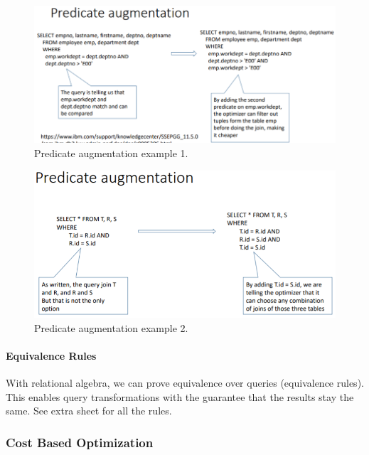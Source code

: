 \begin{figure}[h]
	\centering
	\includegraphics[scale=0.5]{images/3-aug1.PNG}
	\caption{Predicate augmentation example 1.}
	\label{fig:aug1}
\end{figure}

\begin{figure}[h]
	\centering
	\includegraphics[scale=0.5]{images/3-aug2.PNG}
	\caption{Predicate augmentation example 2.}
	\label{fig:aug2}
\end{figure}


\paragraph{Equivalence Rules}
With relational algebra, we can prove equivalence over queries (equivalence rules). This enables query transformations with the guarantee that the results stay the same. See extra sheet for all the rules.











\subsubsection{Cost Based Optimization}

